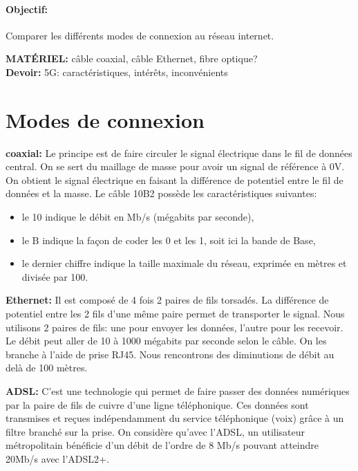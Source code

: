\documentclass[a4paper,11pt]{article}
\begin{document}
\begin{Form}
\paragraph{Objectif:}Comparer les différents modes de connexion au réseau internet.
\begin{commentprof}
\noindent\textbf{MATÉRIEL:} câble coaxial, câble Ethernet, fibre optique?\\
\textbf{Devoir:} 5G: caractéristiques, intérêts, inconvénients
\end{commentprof}
\section{Modes de connexion}
\begin{framed}
\textbf{coaxial:} Le principe est de faire circuler le signal électrique dans le fil de données central. On se sert du maillage de masse pour avoir un signal de référence à 0V. On obtient le signal électrique en faisant la différence de potentiel entre le fil de données et la masse. Le câble 10B2 possède les caractéristiques suivantes:
\begin{itemize}
\item le 10 indique le débit en Mb/s (mégabits par seconde),
\item le B indique la façon de coder les 0 et les 1, soit ici la bande de Base,
\item le dernier chiffre indique la taille maximale du réseau, exprimée en mètres et divisée par 100.
\end{itemize}
\end{framed}
\begin{framed}
\textbf{Ethernet:} Il est composé de 4 fois 2 paires de fils torsadés. La différence de potentiel entre les 2 fils d'une même paire permet de transporter le signal. Nous utilisons 2 paires de fils: une pour envoyer les données, l'autre pour les recevoir. Le débit peut aller de 10 à 1000 mégabits par seconde selon le câble. On les branche à l'aide de prise RJ45. Nous rencontrons des diminutions de débit au delà de 100 mètres.
\end{framed}
\begin{framed}
\textbf{ADSL:} C'est une technologie qui permet de faire passer des données numériques par la paire de fils de cuivre d’une ligne téléphonique. Ces données sont transmises et reçues indépendamment du service téléphonique (voix) grâce à un filtre branché sur la prise. On considère qu’avec l’ADSL, un utilisateur métropolitain bénéficie d’un débit de l’ordre de 8 Mb/s pouvant atteindre 20Mb/s avec l'ADSL2+.

\end{framed}
\end{Form}
\end{document}
